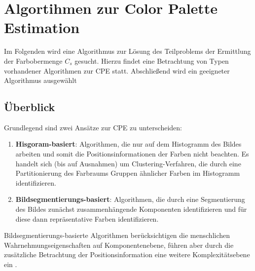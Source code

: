\documentclass[11pt, bibliography=totoc]{scrartcl}
\begin{document}
\section{Algortihmen zur Color Palette Estimation}

Im Folgenden wird eine Algorithmus zur Lösung des Teilproblems der Ermittlung der Farbobermenge $C_s$ gesucht. Hierzu findet eine Betrachtung von Typen vorhandener Algorithmen zur CPE statt. Abschließend wird ein geeigneter Algorithmus ausgewählt

\subsection{Überblick}

Grundlegend sind zwei Ansätze zur CPE zu unterscheiden:
\begin{enumerate}
    \item \textbf{Hisgoram-basiert}: Algorithmen, die nur auf dem Histogramm des Bildes arbeiten und somit die Positionsinformationen der Farben nicht beachten. Es handelt sich (bis auf Ausnahmen) um Clustering-Verfahren, die durch eine Partitionierung des Farbraums Gruppen ähnlicher Farben im Histogramm identifizieren.
    \item \textbf{Bildsegmentierungs-basiert}: Algorithmen, die durch eine Segmentierung des Bildes zunächst zusammenhängende Komponenten identifizieren und für diese dann repräsentative Farben identifizieren.
\end{enumerate}


Bildsegmentierungs-basierte Algorithmen berücksichtigen die menschlichen Wahrnehmungseigenschaften auf Komponentenebene, führen aber durch die zusätzliche Betrachtung der Positionsinformation eine weitere Komplexitätsebene ein \citep{colorthemes}.
\end{document}
